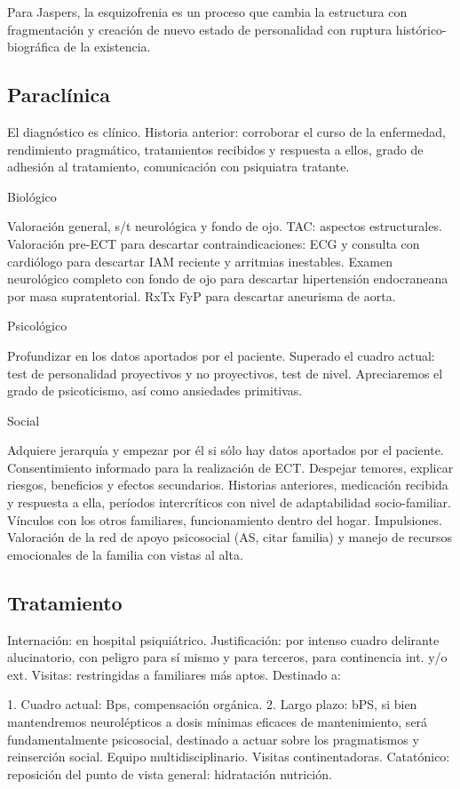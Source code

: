 \documentclass{scrbook}
\begin{document}
Para Jaspers, la esquizofrenia es un proceso que cambia la estructura con fragmentación y creación de nuevo estado de personalidad con ruptura histórico-biográfica de la existencia.

\subsection*{Paraclínica}

El diagnóstico es clínico. Historia anterior: corroborar el curso de la enfermedad, rendimiento pragmático, tratamientos recibidos y respuesta a ellos, grado de adhesión al tratamiento, comunicación con psiquiatra tratante.

Biológico

Valoración general, s/t neurológica y fondo de ojo. TAC: aspectos estructurales. Valoración pre-ECT para descartar contraindicaciones: ECG y consulta con cardiólogo para descartar IAM reciente y arritmias inestables. Examen neurológico completo con fondo de ojo para descartar hipertensión endocraneana por masa supratentorial. RxTx FyP para descartar aneurisma de aorta.

Psicológico

Profundizar en los datos aportados por el paciente. Superado el cuadro actual: test de personalidad proyectivos y no proyectivos, test de nivel. Apreciaremos el grado de psicoticismo, así como ansiedades primitivas.

Social

Adquiere jerarquía y empezar por él si sólo hay datos aportados por el paciente. Consentimiento informado para la realización de ECT. Despejar temores, explicar riesgos, beneficios y efectos secundarios. Historias anteriores, medicación recibida y respuesta a ella, períodos intercríticos con nivel de adaptabilidad socio-familiar. Vínculos con los otros familiares, funcionamiento dentro del hogar. Impulsiones. Valoración de la red de apoyo psicosocial (AS, citar familia) y manejo de recursos emocionales de la familia con vistas al alta.
\subsection*{Tratamiento}
Internación: en hospital psiquiátrico. Justificación: por intenso cuadro delirante alucinatorio, con peligro para sí mismo y para terceros, para continencia int. y/o ext. Visitas: restringidas a familiares más aptos. Destinado a:

1. Cuadro actual: Bps, compensación orgánica. 2. Largo plazo: bPS, si bien mantendremos neurolépticos a dosis mínimas eficaces de mantenimiento, será fundamentalmente psicosocial, destinado a actuar sobre los pragmatismos y reinserción social. Equipo multidisciplinario. Visitas continentadoras. Catatónico: reposición del punto de vista general: hidratación nutrición.
\end{document}
